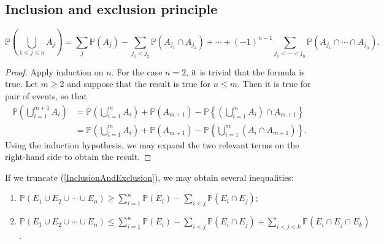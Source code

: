 \documentclass[11pt,singlecolumn, openany, citestyle=authoryear]{elegantbook}
\begin{document}
\begin{CJK}{UTF8}{gbsn}
\section{Inclusion and exclusion principle}
\begin{proposition}
    \begin{equation}\label{InclusionAndExclusion}
    \mathbb{P}(\bigcup_{1 \leq j \leq n}A_j) = \sum_{j}\mathbb{P}(A_j)-
    \sum_{j_1 < j_2}\mathbb{P}(A_{j_1}\cap A_{j_2}) + \cdots + 
    (-1)^{n-1} \sum_{j_1 < \cdots < j_n}\mathbb{P}(A_{j_1}\cap \cdots \cap A_{j_n}).
    \end{equation}
\end{proposition}
\begin{proof}
    Apply induction on $n$. For the case $n=2$, it is trivial that the formula is true.
    Let $m \geqslant 2$ and suppose that the result is true for $n \leqslant m$. Then it is 
    true for pair of events, so that 
    \begin{align*}
        \mathbb{P}\left(\bigcup_{i=1}^{m+1}A_i\right) &= 
        \mathbb{P}\left(\bigcup_{i=1}^{m}A_i\right)+\mathbb{P}(A_{m+1})-
        \mathbb{P}\left\{ \left(\bigcup_{i=1}^{m}A_i\right) \cap A_{m+1} \right\} \\
        &= \mathbb{P}\left(\bigcup_{i=1}^{m}A_i\right)+\mathbb{P}(A_{m+1})-
        \mathbb{P}\left\{\bigcup_{i=1}^{m}(A_i \cap A_{m+1})\right\}. 
    \end{align*}
    Using the induction hypothesis, we may expand the two relevant terms on the right-hand side to obtain 
the result. 
\end{proof}
\begin{remark}
    If we truncate (\ref{InclusionAndExclusion}), we may obtain several inequalities:
    \begin{enumerate}
        \item $\displaystyle \mathbb{P}(E_1\cup E_2 \cup \cdots \cup E_n)\geqslant 
        \sum_{i=1}^n \mathbb{P}(E_i) - \sum_{i<j} \mathbb{P}(E_i\cap E_j); 
        $
    \item $\displaystyle \mathbb{P}(E_1\cup E_2 \cup \cdots \cup E_n)\leqslant 
    \sum_{i=1}^n \mathbb{P}(E_i) - \sum_{i<j} \mathbb{P}(E_i\cap E_j)+
    \sum_{i<j<k} \mathbb{P}(E_i\cap E_j\cap E_k)$.
    \end{enumerate}
\end{remark}


\end{CJK}
\end{document}
